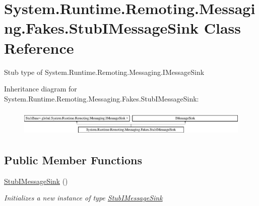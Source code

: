 \hypertarget{class_system_1_1_runtime_1_1_remoting_1_1_messaging_1_1_fakes_1_1_stub_i_message_sink}{\section{System.\-Runtime.\-Remoting.\-Messaging.\-Fakes.\-Stub\-I\-Message\-Sink Class Reference}
\label{class_system_1_1_runtime_1_1_remoting_1_1_messaging_1_1_fakes_1_1_stub_i_message_sink}
}


Stub type of System.\-Runtime.\-Remoting.\-Messaging.\-I\-Message\-Sink 


Inheritance diagram for System.\-Runtime.\-Remoting.\-Messaging.\-Fakes.\-Stub\-I\-Message\-Sink\-:\begin{figure}[H]
\begin{center}
\leavevmode
\includegraphics[height=1.317647cm]{class_system_1_1_runtime_1_1_remoting_1_1_messaging_1_1_fakes_1_1_stub_i_message_sink}
\end{center}
\end{figure}
\subsection*{Public Member Functions}
\begin{DoxyCompactItemize}
\item 
\hyperlink{class_system_1_1_runtime_1_1_remoting_1_1_messaging_1_1_fakes_1_1_stub_i_message_sink_aa74fd23a895b893e7e89203686af8f7e}{Stub\-I\-Message\-Sink} ()
\begin{DoxyCompactList}\small\item\em Initializes a new instance of type \hyperlink{class_system_1_1_runtime_1_1_remoting_1_1_messaging_1_1_fakes_1_1_stub_i_message_sink}{Stub\-I\-Message\-Sink}\end{DoxyCompactList}\end{DoxyCompactItemize}
